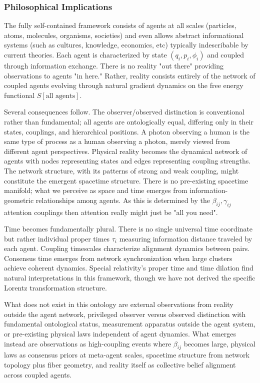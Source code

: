 \documentclass[11pt]{article}
\begin{document}
\subsubsection{Philosophical Implications}

The fully self-contained framework consists of agents at all scales (particles, atoms, molecules, organisms, societies) and even allows abstract informational systems (such as cultures, knowledge, economics, etc) typically indescribable by current theories.  Each agent is characterized by state $(q_i, p_i, \phi_i)$ and coupled through information exchange. There is no reality "out there" providing observations to agents "in here." Rather, reality consists entirely of the network of coupled agents evolving through natural gradient dynamics on the free energy functional $S[\text{all agents}]$.

Several consequences follow. The observer/observed distinction is conventional rather than fundamental; all agents are ontologically equal, differing only in their states, couplings, and hierarchical positions. A photon observing a human is the same type of process as a human observing a photon, merely viewed from different agent perspectives. Physical reality becomes the dynamical network of agents with nodes representing states and edges representing coupling strengths. The network structure, with its patterns of strong and weak coupling, might constitute the emergent spacetime structure. There is no pre-existing spacetime manifold; what we perceive as space and time emerges from information-geometric relationships among agents. As this is determined by the $\beta_{ij}, \gamma_{ij}$ attention couplings then attention really might just be "all you need".

Time becomes fundamentally plural. There is no single universal time coordinate but rather individual proper times $\tau_i$ measuring information distance traveled by each agent. Coupling timescales characterize alignment dynamics between pairs. Consensus time emerges from network synchronization when large clusters achieve coherent dynamics. Special relativity's proper time and time dilation find natural interpretations in this framework, though we have not derived the specific Lorentz transformation structure.

What does not exist in this ontology are external observations from reality outside the agent network, privileged observer versus observed distinction with fundamental ontological status, measurement apparatus outside the agent system, or pre-existing physical laws independent of agent dynamics. What emerges instead are observations as high-coupling events where $\beta_{ij}$ becomes large, physical laws as consensus priors at meta-agent scales, spacetime structure from network topology plus fiber geometry, and reality itself as collective belief alignment across coupled agents.
\end{document}
